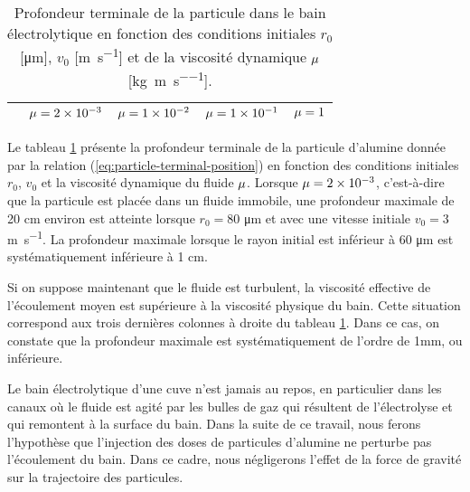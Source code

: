 \begin{table}
  \begin{center}
    \caption{Profondeur terminale de la particule dans le bain
      électrolytique en fonction des conditions initiales $r_0$
      [\si{\micro\meter}], $v_0$ [\si{\meter\per\second}] et de la
      viscosité dynamique $\mu$
      [\si{\kilo\gram\per\meter\per\second}].}
    \label{tab:fall-results}
    \begin{tabularx}{\textwidth}{@{}lXXXX@{}}
      \toprule
      & $\mu = \num{2e-3}$ & $\mu = \num{1e-2}$ & $\mu = \num{1e-1}$ & $\mu = \num{1}$ \\
      \midrule
      
      \bottomrule
    \end{tabularx}
  \end{center}
\end{table}

Le tableau \ref{tab:fall-results} présente la profondeur
terminale de la particule d'alumine donnée par la relation
(\ref{eq:particle-terminal-position}) en fonction des conditions
initiales $r_0$, $v_0$ et la viscosité dynamique du fluide
$\mu$. Lorsque $\mu =
\num{2e-3}$, c'est-à-dire que la particule est placée dans un fluide
immobile, une profondeur maximale de \num{20} \si{\centi\meter}
environ est atteinte lorsque $r_0 = \num{80}$ \si{\micro\meter} et
avec une vitesse initiale $v_0 = \num{3}$ \si{\meter\per\second}. La
profondeur maximale lorsque le rayon initial est inférieur à
\num{60} \si{\micro\meter} est systématiquement inférieure à
\num{1} \si{\centi\meter}.

Si on suppose maintenant que le fluide est turbulent, la viscosité
effective de l'écoulement moyen est supérieure à la viscosité
physique du bain. Cette situation correspond aux trois dernières
colonnes à droite du tableau \ref{tab:fall-results}. Dans ce cas, on
constate que la profondeur maximale est systématiquement de l'ordre de
\num{1}\si{\milli\meter}, ou inférieure.

Le bain électrolytique d'une cuve n'est jamais au repos, en
particulier dans les canaux où le fluide est agité par les bulles de
gaz qui résultent de l'électrolyse et qui remontent à la surface du
bain. Dans la suite de ce travail, nous ferons l'hypothèse que
l'injection des doses de particules d'alumine ne perturbe pas
l'écoulement du bain. Dans ce cadre, nous négligerons l'effet de la
force de gravité sur la trajectoire des particules.

